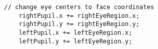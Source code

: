 \begin{lstlisting}
// change eye centers to face coordinates
	rightPupil.x += rightEyeRegion.x;
	rightPupil.y += rightEyeRegion.y;
	leftPupil.x += leftEyeRegion.x;
	leftPupil.y += leftEyeRegion.y;
\end{lstlisting}